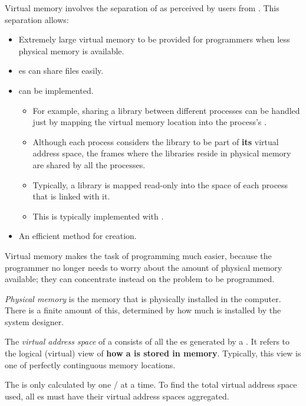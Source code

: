 \begin{definition}\label{def:Virtual_Memory}
  Virtual memory involves the separation of  as perceived by users from .
  This separation allows:
  \begin{itemize}[noitemsep]
  \item Extremely large virtual memory to be provided for programmers when less physical memory is available.
  \item {}es can share files easily.
  \item {} can be implemented.
    \begin{itemize}[noitemsep]
    \item For example, sharing a library between different processes can be handled just by mapping the virtual memory location into the process's .
    \item Although each process considers the library to be part of \textbf{its} virtual address space, the frames where the libraries reside in physical memory are shared by all the processes.
    \item Typically, a library is mapped read-only into the space of each process that is linked with it.
    \item This is typically implemented with .
    \end{itemize}
  \item An efficient method for  creation.
\end{itemize}

  Virtual memory makes the task of programming much easier, because the programmer no longer needs to worry about the amount of physical memory available; they can concentrate instead on the problem to be programmed.
\end{definition}

\begin{definition}\label{def:Physical_Memory}
  \emph{Physical memory} is the memory that is physically installed in the computer.
  There is a finite amount of this, determined by how much is installed by the system designer.
\end{definition}

\begin{definition}\label{def:Virtual_Address_Space}
  The \emph{virtual address space} of a  consists of all the es generated by a .
  It refers to the logical (virtual) view of \textbf{how a  is stored in memory}.
  Typically, this view is one of perfectly continguous memory locations.

  \begin{remark}
    The  is only calculated by one / at a time.
    To find the total virtual address space used, all es must have their virtual address spaces aggregated.
  \end{remark}
\end{definition}


